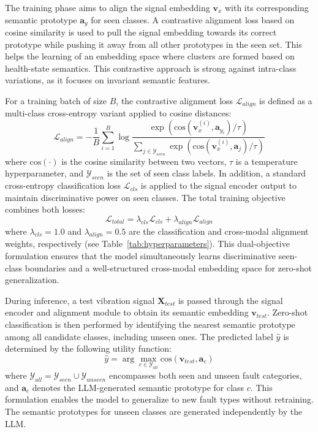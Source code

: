 \documentclass[journal]{IEEEtran}
\begin{document}
The training phase aims to align the signal embedding $\mathbf{v}_x$ with its corresponding semantic prototype $\mathbf{a}_{y}$ for seen classes. A contrastive alignment loss \cite{chen2020simple} based on cosine similarity is used to pull the signal embedding towards its correct prototype while pushing it away from all other prototypes in the seen set. This helps the learning of an embedding space where clusters are formed based on health-state semantics. This contrastive approach is strong against intra-class variations, as it focuses on invariant semantic features.

For a training batch of size $B$, the contrastive alignment loss $\mathcal{L}_{align}$ is defined as a multi-class cross-entropy variant applied to cosine distances:
\begin{equation}
\mathcal{L}_{align} = -\frac{1}{B} \sum_{i=1}^{B} \log \frac{\exp(\text{cos}(\mathbf{v}_x^{(i)}, \mathbf{a}_{y_i}) / \tau)}{\sum_{j \in \mathcal{Y}_{seen}} \exp(\text{cos}(\mathbf{v}_x^{(i)}, \mathbf{a}_j) / \tau)}
\end{equation}
where $\text{cos}(\cdot)$ is the cosine similarity between two vectors, $\tau$ is a temperature hyperparameter, and $\mathcal{Y}_{seen}$ is the set of seen class labels. In addition, a standard cross-entropy classification loss $\mathcal{L}_{cls}$ is applied to the signal encoder output to maintain discriminative power on seen classes. The total training objective combines both losses:
\begin{equation}
\mathcal{L}_{total} = \lambda_{cls} \mathcal{L}_{cls} + \lambda_{align} \mathcal{L}_{align}
\end{equation}
where $\lambda_{cls} = 1.0$ and $\lambda_{align} = 0.5$ are the classification and cross-modal alignment weights, respectively (see Table~\ref{tab:hyperparameters}). This dual-objective formulation ensures that the model simultaneously learns discriminative seen-class boundaries and a well-structured cross-modal embedding space for zero-shot generalization.

During inference, a test vibration signal $\mathbf{X}_{test}$ is passed through the signal encoder and alignment module to obtain its semantic embedding $\mathbf{v}_{test}$. Zero-shot classification is then performed by identifying the nearest semantic prototype among all candidate classes, including unseen ones. The predicted label $\hat{y}$ is determined by the following utility function:
\begin{equation}
\hat{y} = \arg\max_{c \in \mathcal{Y}_{all}} \text{cos}(\mathbf{v}_{test}, \mathbf{a}_c)
\end{equation}
where $\mathcal{Y}_{all} = \mathcal{Y}_{seen} \cup \mathcal{Y}_{unseen}$ encompasses both seen and unseen fault categories, and $\mathbf{a}_c$ denotes the LLM-generated semantic prototype for class $c$. This formulation enables the model to generalize to new fault types without retraining. The semantic prototypes for unseen classes are generated independently by the LLM.
\end{document}
